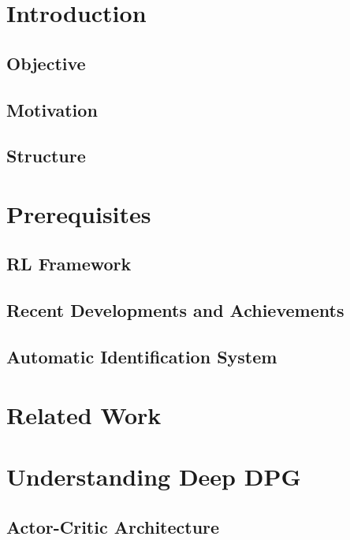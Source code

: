\section{Introduction}

    \subsection{Objective}
    
    \subsection{Motivation}
    \subsection{Structure}
    
\newpage
\section{Prerequisites}
    \subsection{RL Framework}\label{chap:rlframework}
    
    \subsection{Recent Developments and Achievements}
    
    \subsection{Automatic Identification System}
    
    
\newpage
\section{Related Work}\label{chap:relatedWork}


\newpage
\section{Understanding Deep DPG}

    \subsection{Actor-Critic Architecture}
    
